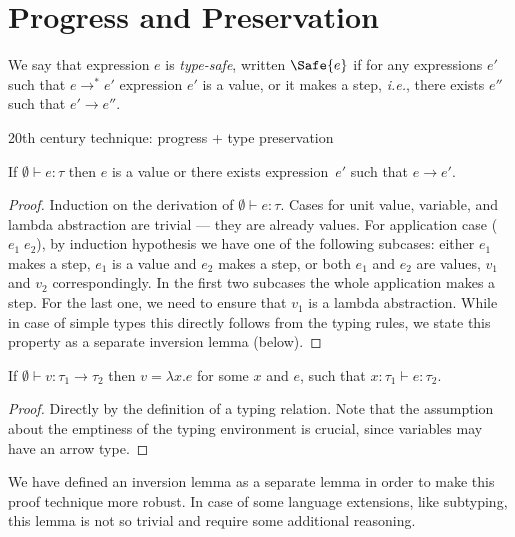 \section{Progress and Preservation}

\begin{defin}
  We say that expression $e$ is \emph{type-safe}, written $\Safe{e}$
  if for any expressions $e'$ such that $e \longrightarrow^* e'$
  expression $e'$ is a value, or it makes a step, \emph{i.e.},
  there exists $e''$ such that $e' \longrightarrow e''$.
\end{defin}

20th century technique: progress + type preservation

\begin{theorem}[Progress]
  If $\emptyset\vdash e : \tau$ then
  $e$ is a value or there exists expression~$e'$
  such that $e \longrightarrow e'$.
\end{theorem}
\begin{proof}
  Induction on the derivation of $\emptyset\vdash e : \tau$.
  Cases for unit value, variable, and lambda abstraction are trivial ---
  they are already values.
  For application case ($e_1\;e_2$), by induction hypothesis we have one
  of the following subcases: either $e_1$ makes a step,
  $e_1$ is a value and $e_2$ makes a step,
  or both $e_1$ and $e_2$ are values, $v_1$ and $v_2$ correspondingly.
  In the first two subcases the whole application makes a step.
  For the last one, we need to ensure that $v_1$ is a lambda abstraction.
  While in case of simple types this directly follows from the typing rules,
  we state this property as a separate inversion lemma (below).
\end{proof}

\begin{lemma}
  If $\emptyset\vdash v : \tau_1 \to \tau_2$
  then $v = \lambda x.e$ for some $x$ and $e$,
  such that $x:\tau_1 \vdash e : \tau_2$.
\end{lemma}
\begin{proof}
  Directly by the definition of a typing relation.
  Note that the assumption about the emptiness of the typing environment
  is crucial, since variables may have an arrow type.
\end{proof}

We have defined an inversion lemma as a separate lemma in order
to make this proof technique more robust.
In case of some language extensions, like subtyping,
this lemma is not so trivial and require some additional reasoning.

